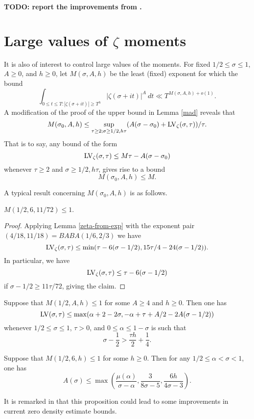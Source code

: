 {\bf TODO: report the improvements from \cite{trudgian-yang}.}

\section{Large values of \texorpdfstring{$\zeta$}{zeta} moments}

It is also of interest to control large values of the moments.  For fixed $1/2 \leq \sigma \leq 1$, $A \geq 0$, and $h \geq 0$, let $M(\sigma,A,h)$ be the least (fixed) exponent for which the bound
$$ \int_{0 \leq t \leq T: |\zeta(\sigma+it)| \geq T^h} |\zeta(\sigma+it)|^A\ dt \ll T^{M(\sigma,A,h)+o(1)}.$$
A modification of the proof of the upper bound in Lemma \ref{mad} reveals that
\begin{equation}\label{msah}
    M(\sigma_0,A,h) \leq \sup_{\tau \geq 2; \sigma \geq 1/2, h\tau} (A(\sigma-\sigma_0) + \mathrm{LV}_\zeta(\sigma,\tau))/\tau.
\end{equation}
That is to say, any bound of the form
$$ \mathrm{LV}_\zeta(\sigma,\tau) \leq M \tau - A (\sigma - \sigma_0)$$
whenever $\tau \geq 2$ and $\sigma \geq 1/2, h\tau$, gives rise to a bound
$$ M(\sigma_0,A,h) \leq M.$$

A typical result concerning $M(\sigma_0,A,h)$ is as follows.

\begin{lemma}\label{ivic-6-large}\cite[(8.56)]{ivic} $M(1/2, 6, 11/72) \leq 1$.
\end{lemma}

\begin{proof} Applying Lemma \ref{zeta-from-exp} with the exponent pair $(4/18, 11/18) = BABA(1/6, 2/3)$ we have
$$  \mathrm{LV}_\zeta(\sigma,\tau) \leq \min( \tau - 6(\sigma-1/2), 15\tau/4 - 24 (\sigma-1/2) ).$$
In particular, we have
$$ \mathrm{LV}_\zeta(\sigma,\tau) \leq \tau - 6(\sigma-1/2)$$
if $\sigma - 1/2 \geq 11 \tau/72$, giving the claim.
\end{proof}

\begin{lemma}\label{bourgain-remark-1}\cite[Proposition 2]{bourgain_remarks_1995} Suppose that $M(1/2,A,h) \leq 1$ for some $A \geq 4$ and $h \geq 0$.  Then one has
    $$ \mathrm{LV}(\sigma,\tau) \leq \max( \alpha + 2 - 2 \sigma, -\alpha + \tau + A/2 - 2A (\sigma-1/2))$$
whenever $1/2 \leq \sigma \leq 1$, $\tau > 0$, and $0 \leq \alpha \leq 1-\sigma$ is such that
$$ \sigma - \frac{1}{2} > \frac{\tau h}{2} + \frac{1}{4}.$$
\end{lemma}

\begin{lemma}\label{bourgain-remark-2}\cite[Proposition 5]{bourgain_remarks_1995}  Suppose that $M(1/2,6,h) \leq 1$ for some $h \geq 0$.  Then for any $1/2 \leq \alpha < \sigma < 1$, one has
$$ A(\sigma) \leq \max( \frac{\mu(\alpha)}{\sigma-\alpha}, \frac{3}{8\sigma-5}, \frac{6h}{4\sigma-3}).$$
\end{lemma}

It is remarked in \cite{bourgain_remarks_1995} that this proposition could lead to some improvements in current zero density estimate bounds.
